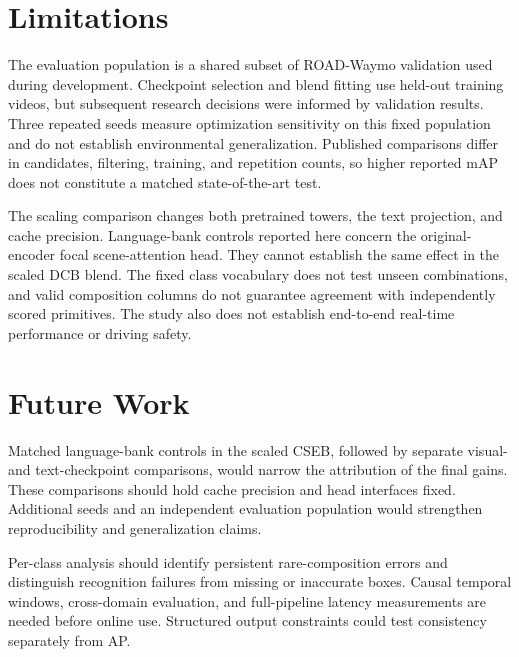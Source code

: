 \section{Limitations}

The evaluation population is a shared subset of ROAD-Waymo validation used during development. Checkpoint selection and blend fitting use held-out training videos, but subsequent research decisions were informed by validation results. Three repeated seeds measure optimization sensitivity on this fixed population and do not establish environmental generalization. Published comparisons differ in candidates, filtering, training, and repetition counts, so higher reported mAP does not constitute a matched state-of-the-art test.

The scaling comparison changes both pretrained towers, the text projection, and cache precision. Language-bank controls reported here concern the original-encoder focal scene-attention head. They cannot establish the same effect in the scaled DCB blend. The fixed class vocabulary does not test unseen combinations, and valid composition columns do not guarantee agreement with independently scored primitives. The study also does not establish end-to-end real-time performance or driving safety.

\section{Future Work}

Matched language-bank controls in the scaled CSEB, followed by separate visual- and text-checkpoint comparisons, would narrow the attribution of the final gains. These comparisons should hold cache precision and head interfaces fixed. Additional seeds and an independent evaluation population would strengthen reproducibility and generalization claims.

Per-class analysis should identify persistent rare-composition errors and distinguish recognition failures from missing or inaccurate boxes. Causal temporal windows, cross-domain evaluation, and full-pipeline latency measurements are needed before online use. Structured output constraints could test consistency separately from AP.
